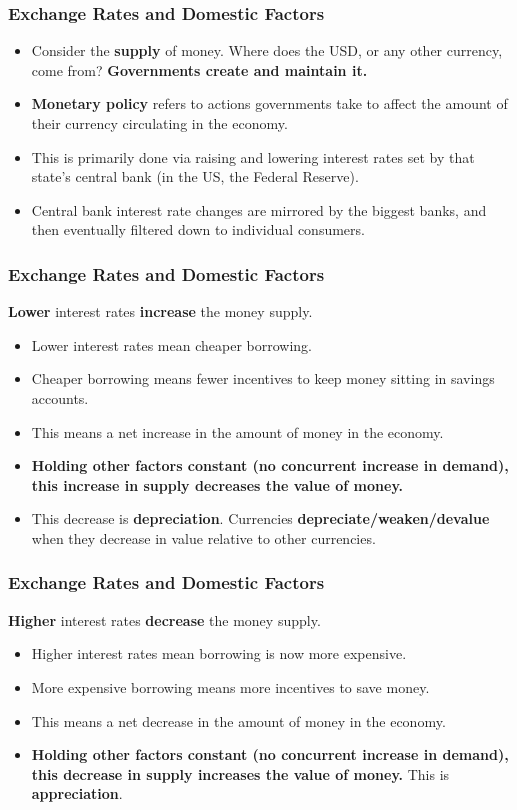\documentclass[handout]{beamer}
\begin{document}
\begin{frame} 
	\frametitle{\LARGE{Exchange Rates and Domestic Factors}}
	\begin{itemize}
		\item Consider the \textbf{supply} of money. Where does the USD, or any other currency, come from? \pause \textbf{Governments create and maintain it.} \pause
		\item \textbf{Monetary policy} refers to actions governments take to affect the amount of their currency circulating in the economy. \pause
		\item This is primarily done via raising and lowering interest rates set by that state's central bank (in the US, the Federal Reserve). \pause
		\item Central bank interest rate changes are mirrored by the biggest banks, and then eventually filtered down to individual consumers. 
	\end{itemize}
\end{frame}

\begin{frame} 
	\frametitle{\LARGE{Exchange Rates and Domestic Factors}}
	\textbf{Lower} interest rates \textbf{increase} the money supply.
		\begin{itemize}
			\item Lower interest rates mean cheaper borrowing. \pause
			\item Cheaper borrowing means fewer incentives to keep money sitting in savings accounts. \pause
			\item This means a net increase in the amount of money in the economy.
			\item \textbf{Holding other factors constant (no concurrent increase in demand), this increase in supply decreases the value of money.}
			\item This decrease is \textbf{depreciation}. Currencies \textbf{depreciate/weaken/devalue} when they decrease in value relative to other currencies. 
		\end{itemize}
\end{frame}

\begin{frame} 
	\frametitle{\LARGE{Exchange Rates and Domestic Factors}}
	\textbf{Higher} interest rates \textbf{decrease} the money supply.
	\begin{itemize}
		\item Higher interest rates mean borrowing is now more expensive. \pause
		\item More expensive borrowing means more incentives to save money. \pause
		\item This means a net decrease in the amount of money in the economy.
		\item \textbf{Holding other factors constant (no concurrent increase in demand), this decrease in supply increases the value of money.} This is \textbf{appreciation}.
	\end{itemize}
\end{frame}
\end{document}
